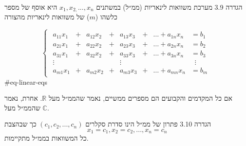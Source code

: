 \documentclass[a4paper, 11pt]{article}
\begin{document}
\begin{envbox}[defcolor]{הגדרה 3.9}
מערכת משוואות לינאריות (ממ״ל) במשתנים $x_1,x_{2,}...,x_n$ היא אוסף של מספר כלשהו ($m$) של משוואות לינאריות מהצורה

\[
\begin{cases}
\begin{alignedat}{7}
a_{11}x_1 &{}+{}& a_{12}x_2 &{}+{}& a_{13}x_3 &{}+{}& \dots + a_{1n}x_n &= b_1 \\[4pt]
a_{21}x_1 &{}+{}& a_{22}x_2 &{}+{}& a_{23}x_3 &{}+{}& \dots + a_{2n}x_n &= b_2 \\[4pt]
a_{31}x_1 &{}+{}& a_{32}x_2 &{}+{}& a_{33}x_3 &{}+{}& \dots + a_{3n}x_n &= b_3 \\[4pt]
\vdots& & & & \vdots & & & \;\;\vdots \\[4pt]
a_{m1}x_1 &{}+{}& a_{m2}x_2 &{}+{}& a_{m3}x_3 &{}+{}& \dots + a_{mn}x_n &= b_m
\end{alignedat}
\end{cases}
\]
 {\#eq-linear-eqs}

אם כל המקדמים והקבועים הם מספרים ממשיים, נאמר שהממ״ל מעל $\mathbb R$. אחרת, נאמר שהממ״ל מעל $\mathbb C$.
\end{envbox}

\begin{envbox}[defcolor]{הגדרה 3.10}
פתרון של ממ״ל הינו סדרת סקלרים $(c_1,c_2,...,c_n)$ כך שבהצבת 
\[
x_1=c_1,x_2=c_2,...,x_n=c_n
\]
 כל המשוואות בממ״ל מתקיימות.
\end{envbox}
\end{document}
